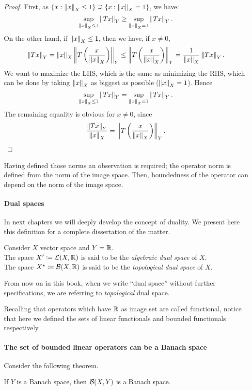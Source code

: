 \begin{proof}
	First, as $\{x : \left\lVert x\right\rVert_X \leq 1\} \supseteq \{x : \left\lVert x\right\rVert_X = 1\}$, we have: 
	$$
		\sup_{\left\lVert x\right\rVert_X \leq 1}\left\lVert Tx\right\rVert_Y 
		\geq \sup_{\left\lVert x\right\rVert_X = 1} \left\lVert Tx\right\rVert_Y
		.
	$$
	On the other hand, if $\left\lVert x\right\rVert_X \leq 1$, then we have, if $x \neq 0$,
	$$
		\left\lVert Tx\right\rVert_Y 
		= \left\lVert x\right\rVert_X\left\lVert T\left(\frac{x}{\left\lVert x\right\rVert_X}\right)\right\rVert_Y 
		\leq \left\lVert T\left(\frac{x}{\left\lVert x\right\rVert_X}\right)\right\rVert_Y
		= \frac{1}{\left\lVert x\right\rVert_X} \left\lVert Tx\right\rVert_Y
		.
	$$
	We want to maximize the LHS, which is the same as minimizing the RHS, which can be done by taking $\left\lVert x\right\rVert_X$ as biggest as possible ($\left\lVert x\right\rVert_X=1$). Hence 
	$$
		\sup_{\left\lVert x\right\rVert_X\leq 1}\left\lVert Tx\right\rVert_Y 
		= \sup_{\left\lVert x\right\rVert_X=1}\left\lVert Tx\right\rVert_Y
		.
	$$
	The remaining equality is obvious for $x \neq 0$, since
	$$
		\frac{\left\lVert Tx\right\rVert_Y}{\left\lVert x\right\rVert_X} 
		= \left\lVert T\left(\frac{x}{\left\lVert x\right\rVert_X}\right)\right\rVert_Y
		.
	$$
\end{proof}

Having defined those norms an observation is required; the operator norm is defined from the norm of the image space. Then, boundedness of the operator can depend on the norm of the image space.

\paragraph{Dual spaces} In next chapters we will deeply develop the concept of duality. We present here this definition for a complete dissertation of the matter.

\begin{defn} \label{defn-dual-star}
	Consider $X$ vector space and $Y=\mathbb R$.\\
	The space $X' \coloneqq \mathcal L(X, \mathbb R)$ is said to be the \emph{algebraic dual space} of $X$.\\
	The space $X^\star \coloneqq \mathcal B(X, \mathbb R)$ is said to be the \emph{topological dual space} of $X$.
\end{defn}

From now on in this book, when we write ``dual space'' without further specifications, we are referring to \textit{topological} dual space.

Recalling that operators which have $\mathbb R$ as image set are called functional, notice that here we defined the sets of linear functionals and bounded functionals respectively.

\paragraph{The set of bounded linear operators can be a Banach space} Consider the following theorem.
\begin{theo}\label{theo-Bc-banach}
	If $Y$ is a Banach space, then $\mathcal B(X,Y)$ is a Banach space.
\end{theo}

